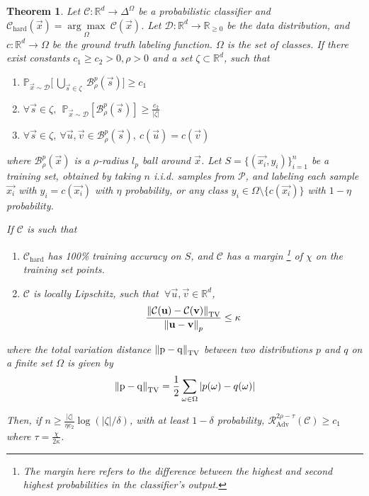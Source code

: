 \documentclass{ociamthesis}
\newtheorem{theorem}{Theorem}
\begin{document}
\begin{theorem}
    \label{theorem:Lipschitzness-extension}
    Let $\mathcal{C}: \mathbb{R}^d \to \Delta^\Omega$ be a probabilistic
    classifier and $\mathcal{C}_\text{hard}(\vec{x}) =
    \underset{\Omega}{\arg\max}~\mathcal{C}(\vec{x})$. Let $\mathcal{D}:
    \mathbb{R}^d \to \mathbb{R}_{\geq 0}$ be the data distribution, and $c:
    \mathbb{R}^d \to \Omega$ be the ground truth labeling function. $\Omega$ is
    the set of classes. If there exist constants $c_1 \geq c_2 > 0, \rho > 0$
    and a set $\zeta \subset \mathbb{R}^d$, such that
    \begin{enumerate}
        \item $\mathbb{P}_{\vec{x} \sim \mathcal{D}} \bigg [~\underset{\vec{s}
        \in \zeta}{\bigcup}~\mathcal{B}_\rho^p(\vec{s}) \bigg ] \geq c_1$
        \item $\forall \vec{s} \in \zeta,~~ \mathbb{P}_{\vec{x} \sim
        \mathcal{D}} [\mathcal{B}_\rho^p(\vec{s})] \geq \frac{c_2}{|\zeta|}$
        \item $\forall \vec{s} \in \zeta,~\forall \vec{u}, \vec{v} \in
        \mathcal{B}_\rho^p(\vec{s}),~c(\vec{u}) = c(\vec{v})$
    \end{enumerate}
    where $\mathcal{B}^p_\rho(\vec{x})$ is a $\rho$-radius $l_p$ ball around
    $\vec{x}$. Let $S=\{(\vec{x_i},y_i)\}_{i=1}^n$ be a training set, obtained
    by taking $n$ i.i.d. samples from $\mathcal{P}$, and labeling each sample
    $\vec{x_i}$ with $y_i=c(\vec{x_i})$ with $\eta$ probability, or any class
    $y_i\in\Omega\setminus\{c(\vec{x_i})\}$ with $1-\eta$ probability.
    
    If $\mathcal{C}$ is such that 
    \begin{enumerate}
        \item $\mathcal{C}_\text{hard}$ has 100\% training accuracy on $S$, and
        $\mathcal{C}$ has a margin \footnote{The margin here refers to the
        difference between the highest and second highest probabilities in the
        classifier's output.} of $\chi$ on the training set points.
        \item $\mathcal{C}$ is locally Lipschitz, such that $~\forall \vec{u},
        \vec{v} \in \mathbb{R}^d$,
            \begin{equation*}
                \frac{\mathrm{\left\lVert\mathcal{C}({\mathbf{u}}) - \mathcal{C}({\mathbf{v}})
                \right\rVert}_\text{TV}}
                    {\mathrm{\left\lVert{\mathbf{u}} - {\mathbf{v}}\right\rVert}_p} 
                \leq \kappa
            \end{equation*}
    \end{enumerate}
    where the total variation distance $\mathrm{\left\lVert p-q\right\rVert}_\text{TV}$ between two
    distributions $p$ and $q$ on a finite set $\Omega$ is given by
    \begin{equation*}
        \mathrm{\left\lVert p-q\right\rVert}_\text{TV} = \frac{1}{2}\sum_{\omega\in\Omega} 
        |p(\omega)-q(\omega)|
    \end{equation*}
    
    Then, if $n \geq \frac{|\zeta|}{\eta c_2} \log (|\zeta|/\delta)$, with at
    least $1-\delta$ probability,
    $\mathcal{R}_{\text{Adv}}^{2\rho-\tau}(\mathcal{C}) \geq c_1$ where $\tau =
    \frac{\chi}{2\kappa}$.
\end{theorem}
\end{document}
